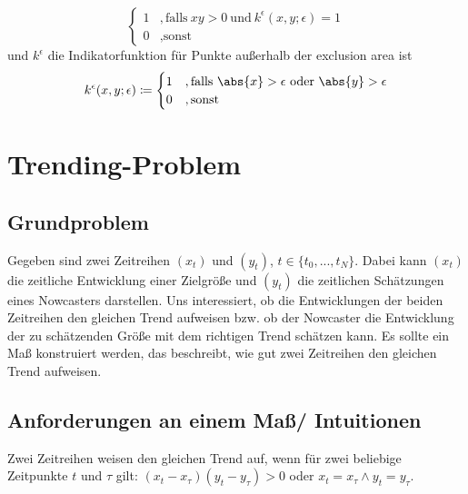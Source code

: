 \documentclass{article}
\theoremstyle{plain}%
\theoremstyle{definition}
\DeclarePairedDelimiter{\abs}\lvert\rvert
\begin{document}
\begin{itemize}
\begin{equation}
\begin{cases}
  			1 &, \text{falls}\ xy > 0\ \text{und}\ k^\epsilon(x, y; \epsilon) = 1\\
  			0 &, \text{sonst}
  		\end{cases}
	\end{equation}
	und $k^\epsilon$ die Indikatorfunktion für Punkte außerhalb der exclusion area ist
	\begin{equation}
  		k^\epsilon (x, y; \epsilon) \coloneqq \begin{cases}
  			1 &, \text{falls} \ \abs{x} > \epsilon \text{oder} \ \abs{y} > \epsilon \\
  			0 &, \text{sonst}
  		\end{cases}
	\end{equation}
\end{itemize}

\section{Trending-Problem}
\subsection{Grundproblem}
Gegeben sind zwei Zeitreihen $(x_t)$ und $(y_t)$, $t\in \{t_0,...,t_N\}$. Dabei kann $(x_t)$ die zeitliche Entwicklung einer Zielgröße und $(y_t)$ die zeitlichen Schätzungen eines Nowcasters darstellen. Uns interessiert, ob die Entwicklungen der beiden Zeitreihen den gleichen Trend aufweisen bzw. ob der Nowcaster die Entwicklung der zu schätzenden Größe mit dem richtigen Trend schätzen kann. Es sollte ein Maß konstruiert werden, das beschreibt, wie gut zwei Zeitreihen den gleichen Trend aufweisen.
\subsection{Anforderungen an einem Maß/ Intuitionen}

Zwei Zeitreihen weisen den gleichen Trend auf, wenn für zwei beliebige Zeitpunkte $t$ und $\tau$ gilt: $(x_t-x_\tau)(y_t-y_\tau)>0$ oder $x_t=x_\tau \land y_t = y_\tau$.

\end{document}
